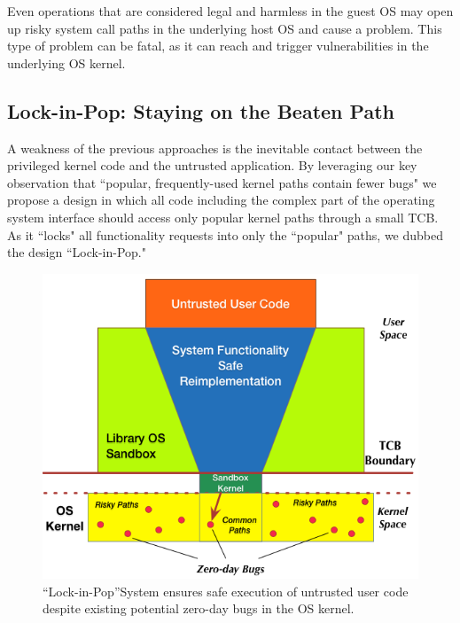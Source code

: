 Even operations that are considered
legal and harmless in the guest OS may open up risky system call paths in the underlying
host OS and cause a problem.
This type of problem can be fatal, 
as it can reach and trigger vulnerabilities in the underlying OS kernel.

\subsection{Lock-in-Pop: Staying on the Beaten Path }
A weakness of the previous approaches is the inevitable contact
between the privileged kernel code and the untrusted application. 
By leveraging our key observation 
that ``popular, frequently-used kernel paths contain fewer bugs" we propose a design
in which all code including the complex part
of the operating system interface should access only
popular kernel paths through a small TCB. As it ``locks" all functionality 
requests into only the ``popular" paths, we dubbed the
design ``Lock-in-Pop."

\begin{figure}%
\centering
\includegraphics[width=.9\columnwidth]{diagram/Virtualization_Design_Model_01.png}
\caption{\small ``Lock-in-Pop''System ensures safe execution of untrusted user code
despite existing potential zero-day bugs in the OS kernel.}
\label{fig:design_safe_reimplementation}
\end{figure}

